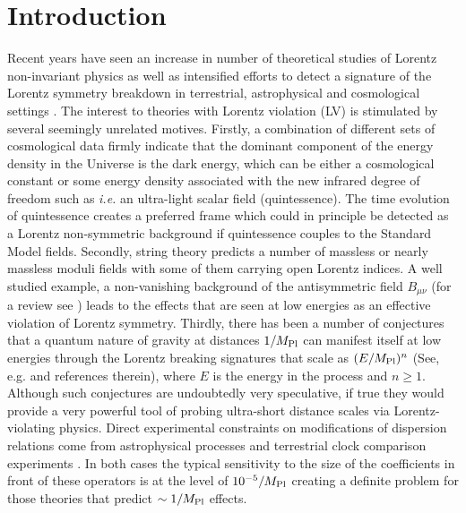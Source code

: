\documentclass[paper,12pt]{revtex4}
\begin{document}
\newpage

\setcounter{footnote}{0}
\setcounter{equation}{0}


\section{Introduction}
\label{Intro}
	
Recent years have seen an increase in number of theoretical studies 
of Lorentz non-invariant physics as well as intensified efforts to detect
a signature of the Lorentz symmetry breakdown  in terrestrial, astrophysical and
cosmological settings \cite{Kost1,CG,Jacobsonreview,PhysToday}. The interest to 
theories with Lorentz violation (LV) is stimulated by several seemingly 
unrelated motives. Firstly, a combination of different sets of 
cosmological data firmly indicate that the dominant 
component of the energy density in the Universe is the dark energy, 
which can be either a cosmological constant or some energy density 
associated with the new infrared degree of freedom such as {\em i.e.} 
an ultra-light scalar field (quintessence). 
The time evolution of quintessence creates a preferred frame 
which could in principle be detected as a Lorentz non-symmetric background if 
quintessence couples to the Standard Model fields. 
Secondly, string theory predicts a number of massless or nearly massless 
moduli fields with some of them carrying open Lorentz indices. A well studied 
example, a non-vanishing background of the antisymmetric field $B_{\mu\nu}$
(for a review see \cite{DN})
leads to the effects that are seen at low energies as an effective 
violation of Lorentz symmetry. Thirdly, there has been a number of 
conjectures that a quantum nature of gravity at distances $1/M_{\rm Pl}$ 
can manifest itself at low energies through the  Lorentz breaking signatures 
that scale as $(E/M_{\rm Pl})^n$ (See, e.g. \cite{lcq} and references therein), 
where $E$ is the energy in 
the process and $n \geq 1$. Although such conjectures are undoubtedly 
very speculative, if true they would provide a very powerful tool of probing 
ultra-short distance scales via Lorentz-violating physics.  Direct experimental constraints on 
modifications of dispersion relations come from astrophysical processes 
\cite{CFJ,AmC,Ted1,GK,Kost2,Sarkar} and terrestrial 
clock comparison experiments \cite{clock1,clock2,Vuc,MP:}. In both cases the 
typical sensitivity to the size of the coefficients in 
front of these operators is at the level of $10^{-5}/M_{\rm Pl}$ creating 
a definite problem for those theories that predict $\sim 1/M_{\rm Pl}$ effects.
\end{document}
